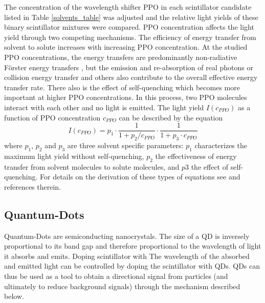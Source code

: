 \documentclass{JINST}
\begin{document}
 
 The concentration of the wavelength shifter PPO in each scintillator candidate listed in Table \ref{solvents_table} was adjusted and the relative light yields of these binary scintillator mixtures were compared. PPO concentration affects the light yield through two competing mechanisms. The efficiency of energy transfer from solvent to solute increases with increasing PPO concentration. At the studied PPO concentrations, the energy transfers are predominantly non-radiative F\"orster energy transfers \cite{foerster48,foerster59}, but the emission and re-absorption of real photons or collision energy transfer and others \cite{dexter53} also contribute to the overall effective energy transfer rate. There also is the effect of self-quenching \cite{birks64} which becomes more important at higher PPO concentrations. In this process, two PPO molecules interact with each other and no light is emitted. 
The light yield $I(c_{PPO})$ as a function of PPO concentration $c_{PPO}$ can be described by the equation 
\begin{equation}
\label{fit_eq}
I(c_{PPO})=p_1 \cdot \frac{1}{1+p_2/c_{PPO}} \cdot \frac{1}{1+p_3\cdot c_{PPO}}
\end{equation} 
where $p_1$, $p_2$ and $p_3$ are three solvent specific parameters: $p_1$ characterizes the maximum light yield without self-quenching, $p_2$ the effectiveness of energy transfer from solvent molecules to solute molecules, and $p3$ the effect of self-quenching. For details on the derivation of these types of equations see \cite{buck07,aberle11} and references therein. 

\subsection{Quantum-Dots}\label{qd_sec}
Quantum-Dots are semiconducting nanocrystals. The size of a QD is inversely proportional to its band gap and therefore proportional to the wavelength of light it absorbs and emits. Doping scintillator with The wavelength of the absorbed and emitted light can be controlled by doping the scintillator with QDs. QDs can thus be used as a tool to obtain a directional signal from particles (and ultimately to reduce background signals) through the mechanism described below.
\end{document}
